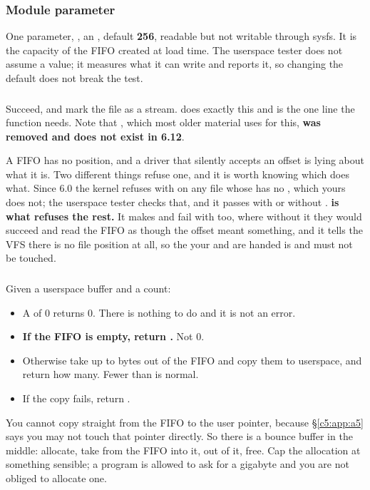 \subsubsection{Module parameter}
\label{c5:app:b:module-parameter}

One parameter, , an , default \textbf{256}, readable but not writable
through sysfs. It is the capacity of the FIFO created at load time. The userspace tester does not
assume a value; it measures what it can write and reports it, so changing the default does not break
the test.

\subsubsection{}
\label{c5:app:b:open}

Succeed, and mark the file as a stream.  does exactly this and is the one line
the function needs. Note that , which most older material uses for this, \textbf{was
removed and does not exist in 6.12}.

A FIFO has no position, and a driver that silently accepts an offset is lying about what it is. Two
different things refuse one, and it is worth knowing which does what. Since 6.0 the kernel refuses
 with  on any file whose  has no ,
which yours does not; the userspace tester checks that, and it passes with or without
. \textbf{ is what refuses the rest.} It makes  and
 fail with  too, where without it they would succeed and read the FIFO as
though the offset meant something, and it tells the VFS there is no file position at all, so the
 your  and  are handed is  and must not be touched.

\subsubsection{}
\label{c5:app:b:read}

Given a userspace buffer and a count:
\begin{itemize}
  \item A  of 0 returns 0. There is nothing to do and it is not an error.
  \item \textbf{If the FIFO is empty, return .} Not 0.
  \item Otherwise take up to  bytes out of the FIFO and copy them to userspace, and
    return how many. Fewer than  is normal.
  \item If the copy fails, return .
\end{itemize}
You cannot copy straight from the FIFO to the user pointer, because \S\ref{c5:app:a5} says you may
not touch that pointer directly. So there is a bounce buffer in the middle: allocate, take from the
FIFO into it,  out of it, free. Cap the allocation at something sensible; a
program is allowed to ask for a gigabyte and you are not obliged to allocate one.

